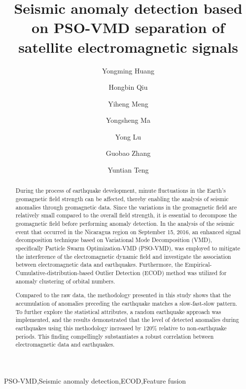 \documentclass[3p,authoryear,preprint,12pt]{elsarticle}
\makeatletter
\def\ead{\@ifnextchar[{\@uad}{\@ead}}
\gdef\@ead#1{\bgroup
   \def\_{\string\underscorechar\space}
   \def\{{\string\lbracechar\space}
   \def\textdagger{\string\textdagger\space}
   \def\texttildeapprox{\string\texttildeapprox\space}
   \def~{\hashchar\space}
   \def\}{\string\rbracechar\space}
   \edef\tmp{\the\@eadauthor}
   \immediate\write\@auxout{\string\emailauthor
     {#1}{\expandafter\strip@prefix\meaning\tmp}}
  \egroup
}
\gdef\emailauthor#1#2{\stepcounter{ead}
      \g@addto@macro\@elseads{\raggedright
      \let\corref\@gobble
      \eadsep\texttt{#1} (#2)
      \def\eadsep{\unskip,\space}}
}
\makeatother
\begin{document}
\begin{frontmatter}

    \title{
  Seismic anomaly detection based on PSO-VMD separation of satellite electromagnetic signals    
}
    
\author[1]{Yongming Huang}
\ead{huang\_ym@seu.edu.cn}\cortext[c-8fddee302652]{Corresponding author.}
\author[1]{Hongbin Qiu}
\author[1]{Yiheng Meng}

\author[1]{Yongsheng Ma}
\author[2]{Yong Lu}
\author[1]{Guobao Zhang}
\author[3]{Yuntian Teng}   
\address[1]{
    Southeast University\unskip, Nanjing\unskip, 210096\unskip, China}
\address[2]{Seismological Bureau of Jiangsu Province\unskip, Nanjing\unskip, 210006\unskip, China}
\address[3]{Institute of Geophysics\unskip, China Earthquake Administration\unskip, Beijing\unskip, 100081\unskip, China}
  

\begin{abstract}

During the process of earthquake development, minute fluctuations in the Earth's geomagnetic field strength can be affected, thereby enabling the analysis of seismic anomalies through geomagnetic data. Since the variations in the geomagnetic field are relatively small compared to the overall field strength, it is essential to decompose the geomagnetic field before performing anomaly detection. In the analysis of the seismic event that occurred in the Nicaragua region on September 15, 2016, an enhanced signal decomposition technique based on Variational Mode Decomposition (VMD), specifically Particle Swarm Optimization-VMD (PSO-VMD), was employed to mitigate the interference of the electromagnetic dynamic field and investigate the association between electromagnetic data and earthquakes. Furthermore, the Empirical-Cumulative-distribution-based Outlier Detection (ECOD) method was utilized for anomaly clustering of orbital numbers.

{Compared to the raw data, the methodology presented in this study shows that the accumulation of anomalies preceding the earthquake matches a slow-fast-slow pattern.} To further explore the statistical attributes, a random earthquake approach was implemented, and the results demonstrated that the level of detected anomalies during earthquakes using this methodology increased by 120\% relative to non-earthquake periods. This finding compellingly substantiates a robust correlation between electromagnetic data and earthquakes.
\end{abstract}
      \begin{keyword}
    PSO-VMD\sep Seismic anomaly detection\sep ECOD\sep Feature fusion
      \end{keyword}
    
  \end{frontmatter}
\end{document}
